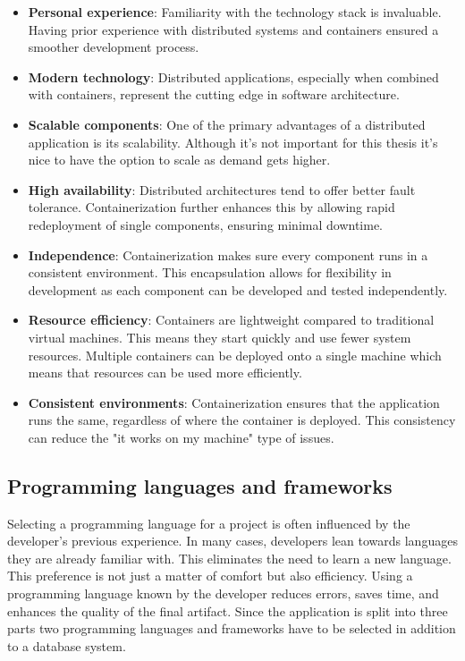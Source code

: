 \begin{itemize}
    \item \textbf{Personal experience}: Familiarity with the technology stack is invaluable. Having prior experience with distributed systems and containers ensured a smoother development process.
    \item \textbf{Modern technology}: Distributed applications, especially when combined with containers, represent the cutting edge in software architecture. 
    \item \textbf{Scalable components}: One of the primary advantages of a distributed application is its scalability. Although it's not important for this thesis it's nice to have the option to scale as demand gets higher.
    \item \textbf{High availability}: Distributed architectures tend to offer better fault tolerance. Containerization further enhances this by allowing rapid redeployment of single components, ensuring minimal downtime.
    \item \textbf{Independence}: Containerization makes sure every component runs in a consistent environment. This encapsulation allows for flexibility in development as each component can be developed and tested independently.
    \item \textbf{Resource efficiency}: Containers are lightweight compared to traditional virtual machines. This means they start quickly and use fewer system resources. Multiple containers can be deployed onto a single machine which means that resources can be used more efficiently.
    \item \textbf{Consistent environments}: Containerization ensures that the application runs the same, regardless of where the container is deployed. This consistency can reduce the "it works on my machine" type of issues. 
\end{itemize}

\subsection{Programming languages and frameworks}

Selecting a programming language for a project is often influenced by the developer's previous experience. In many cases, developers lean towards languages they are already familiar with. This eliminates the need to learn a new language. This preference is not just a matter of comfort but also efficiency. Using a programming language known by the developer reduces errors, saves time, and enhances the quality of the final artifact. Since the application is split into three parts two programming languages and frameworks have to be selected in addition to a database system.


